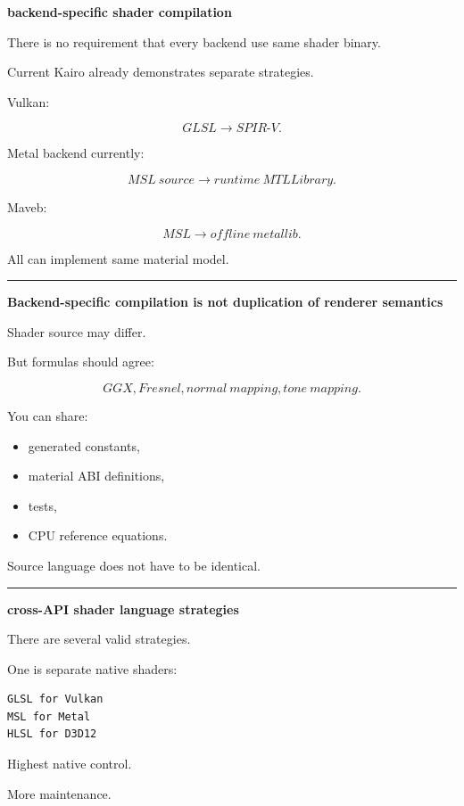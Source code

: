 \textbf{backend-specific shader compilation}

There is no requirement that every backend use same shader binary.

Current Kairo already demonstrates separate strategies.

Vulkan:

\[
GLSL
\rightarrow
SPIR\text{-}V.
\]

Metal backend currently:

\[
MSL\ source
\rightarrow
runtime\ MTLLibrary.
\]

Maveb:

\[
MSL
\rightarrow
offline\ metallib.
\]

All can implement same material model.

\begin{center}\rule{0.5\linewidth}{0.5pt}\end{center}

\textbf{Backend-specific compilation is not duplication of renderer semantics}

Shader source may differ.

But formulas should agree:

\[
GGX,
Fresnel,
normal\ mapping,
tone\ mapping.
\]

You can share:

\begin{itemize}
\tightlist
\item
  generated constants,
\item
  material ABI definitions,
\item
  tests,
\item
  CPU reference equations.
\end{itemize}

Source language does not have to be identical.

\begin{center}\rule{0.5\linewidth}{0.5pt}\end{center}

\textbf{cross-API shader language strategies}

There are several valid strategies.

One is separate native shaders:

\begin{verbatim}
GLSL for Vulkan
MSL for Metal
HLSL for D3D12
\end{verbatim}

Highest native control.

More maintenance.

